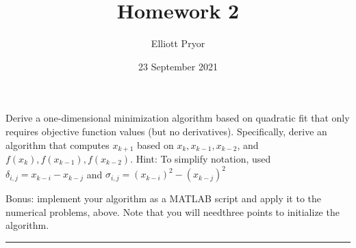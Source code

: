 \documentclass[11pt]{article}
\title{Homework 2}
\author{Elliott Pryor}
\date{23 September 2021}
\begin{document}
\maketitle



Derive a one-dimensional minimization algorithm based on quadratic fit that only requires objective function
values (but no derivatives). Specifically, derive an algorithm that computes $x_{k+1}$
based on $x_k,x_{k-1},x_{k-2}$, and $f(x_k),f(x_{k-1}),f(x_{k-2})$. 
Hint: To simplify notation, used
$\delta_{i,j} = x_{k-i} - x_{k-j}$ and $\sigma_{i,j} = (x_{k-i})^2 - (x_{k-j})^2$

Bonus: implement your algorithm as a MATLAB script and apply it to the numerical problems, above. 
Note that you will needthree points to initialize the algorithm.

\hrule
\end{document}
